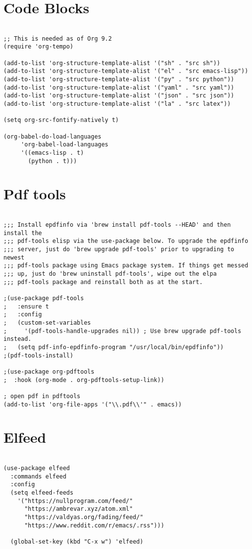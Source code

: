 \documentclass[11pt]{article}
\begin{document}
\section{Code Blocks}
\label{sec:org116390d}
\begin{verbatim}

;; This is needed as of Org 9.2
(require 'org-tempo)

(add-to-list 'org-structure-template-alist '("sh" . "src sh"))
(add-to-list 'org-structure-template-alist '("el" . "src emacs-lisp"))
(add-to-list 'org-structure-template-alist '("py" . "src python"))
(add-to-list 'org-structure-template-alist '("yaml" . "src yaml"))
(add-to-list 'org-structure-template-alist '("json" . "src json"))
(add-to-list 'org-structure-template-alist '("la" . "src latex"))

(setq org-src-fontify-natively t)

(org-babel-do-load-languages
	 'org-babel-load-languages
	 '((emacs-lisp . t)
	   (python . t)))
\end{verbatim}

\section{Pdf tools}
\label{sec:orgc63855f}
\begin{verbatim}

;;; Install epdfinfo via 'brew install pdf-tools --HEAD' and then install the
;;; pdf-tools elisp via the use-package below. To upgrade the epdfinfo
;;; server, just do 'brew upgrade pdf-tools' prior to upgrading to newest
;;; pdf-tools package using Emacs package system. If things get messed
;;; up, just do 'brew uninstall pdf-tools', wipe out the elpa
;;; pdf-tools package and reinstall both as at the start.

;(use-package pdf-tools
; 	:ensure t
;	:config
;	(custom-set-variables
;	  '(pdf-tools-handle-upgrades nil)) ; Use brew upgrade pdf-tools instead.
;   (setq pdf-info-epdfinfo-program "/usr/local/bin/epdfinfo"))
;(pdf-tools-install)

;(use-package org-pdftools
;  :hook (org-mode . org-pdftools-setup-link))

; open pdf in pdftools 
(add-to-list 'org-file-apps '("\\.pdf\\'" . emacs))

\end{verbatim}

\section{Elfeed}
\label{sec:orgdb9aab3}
\begin{verbatim}

(use-package elfeed
  :commands elfeed
  :config
  (setq elfeed-feeds
    '("https://nullprogram.com/feed/"
      "https://ambrevar.xyz/atom.xml"
      "https://valdyas.org/fading/feed/"
      "https://www.reddit.com/r/emacs/.rss")))

  (global-set-key (kbd "C-x w") 'elfeed)

\end{verbatim}
\end{document}
